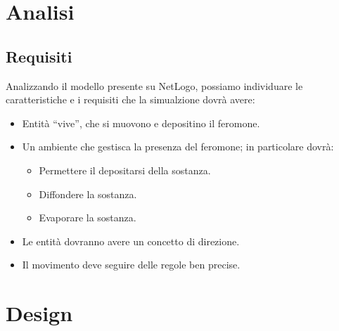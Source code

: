 \documentclass[12pt,a4paper,openright,twoside]{book}
\begin{document}
\chapter{Analisi}
\section{Requisiti} %
Analizzando il modello presente su NetLogo\cite{wilensky1997netlogo}, possiamo individuare 
le caratteristiche e i requisiti che la simualzione dovrà avere:
\begin{itemize}
    \item Entità ``vive'', che si muovono e depositino il feromone.
    \item Un ambiente che gestisca la presenza del feromone; in particolare dovrà:
    \begin{itemize}
        \item Permettere il depositarsi della sostanza.
        \item Diffondere la sostanza.
        \item Evaporare la sostanza.
    \end{itemize}
    \item Le entità dovranno avere un concetto di direzione.
    \item Il movimento deve seguire delle regole ben precise.
\end{itemize}

\chapter{Design}
\end{document}

